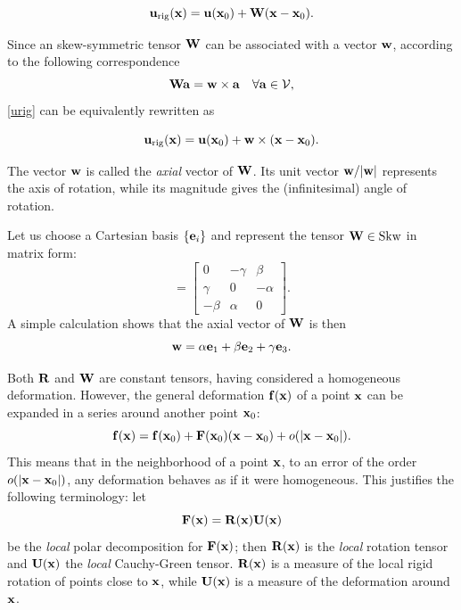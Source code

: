\begin{definition}
	\begin{equation}\label{urig}
		\mathbf{u}_{\rm rig}(\mathbf{x})=\mathbf{u}(\mathbf{x}_0)+\mathbf{W} (\mathbf{x}-\mathbf{x}_0).
	\end{equation}
\end{definition}
Since an skew-symmetric tensor \(\mathbf{W}\) can be associated with a vector \(\mathbf{w}\), according to the following correspondence
\begin{equation}
	\mathbf{W} \mathbf{a}=\mathbf{w} \times \mathbf{a} \quad \forall \mathbf{a}\in \mathcal{V},
\end{equation}
\eqref{urig} can be equivalently rewritten as
\begin{definition}
	\begin{equation}\label{urig}
		\mathbf{u}_{\rm rig}(\mathbf{x})=\mathbf{u}(\mathbf{x}_0)+\mathbf{w} \times(\mathbf{x}-\mathbf{x}_0).
	\end{equation}
\end{definition}
The vector \(\mathbf{w}\) is called the \textit{axial} vector of \(\mathbf{W}\). Its unit vector \(\mathbf{w}/|\mathbf{w}|\) represents the axis of rotation, while its magnitude gives the (infinitesimal) angle of rotation.

\begin{remark}\label{skvec}
	Let us choose a Cartesian basis \(\{\mathbf{e}_i\}\) and represent the tensor \(\mathbf{W}\in\operatorname{Skw}\) in matrix form:
	\begin{equation}
		[\Wb]=\left[\begin{array}{ccc}0&-\gamma&\beta\\\gamma&0&-\alpha\\-\beta&\alpha&0\end{array}\right].
	\end{equation}
	A simple calculation shows that the axial vector of \(\mathbf{W}\) is then
	\begin{equation}
		\mathbf{w}=\alpha\mathbf{e}_1+\beta\mathbf{e}_2+\gamma\mathbf{e}_3.
	\end{equation}
\end{remark}

Both \(\mathbf{R}\) and \(\mathbf{W}\) are constant tensors, having considered a homogeneous deformation. However, the general deformation \(\mathbf{f}(\mathbf{x})\) of a point \(\mathbf{x}\) can be expanded in a series around another point \(\mathbf{x}_0\):
\begin{equation}
	\mathbf{f}(\mathbf{x})=\mathbf{f}(\mathbf{x}_0)+\mathbf{F}(\mathbf{x}_0)(\mathbf{x}-\mathbf{x}_0)+o(|\mathbf{x}-\mathbf{x}_0|).
\end{equation}
This means that in the neighborhood of a point \(\mathbf{x}\), to an error of the order \(o(|\mathbf{x}-\mathbf{x}_0|)\), any deformation behaves as if it were homogeneous. This justifies the following terminology: let
\begin{equation}
	\mathbf{F}(\mathbf{x})=\mathbf{R}(\mathbf{x})\mathbf{U}(\mathbf{x})
\end{equation}
be the \textit{local} polar decomposition for \(\mathbf{F}(\mathbf{x})\); then \(\mathbf{R}(\mathbf{x})\) is the \textit{local} rotation tensor and \(\mathbf{U}(\mathbf{x})\) the \textit{local} Cauchy-Green tensor. \(\mathbf{R}(\mathbf{x})\) is a measure of the local rigid rotation of points close to \(\mathbf{x}\), while \(\mathbf{U}(\mathbf{x})\) is a measure of the deformation around \(\mathbf{x}\).

